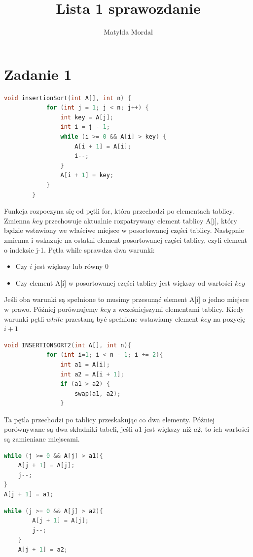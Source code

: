 \documentclass{article}
\author{Matylda Mordal}
\title{\textbf{Lista 1 sprawozdanie}}
\date{}
\begin{document}
	\maketitle
	\section*{Zadanie 1}
	\begin{lstlisting}[language=C++, tabsize=3]
		void insertionSort(int A[], int n) {
			for (int j = 1; j < n; j++) {
				int key = A[j]; 
				int i = j - 1;
				while (i >= 0 && A[i] > key) {
					A[i + 1] = A[i];
					i--;
				}
				A[i + 1] = key; 
			}
		}
    \end{lstlisting}
    Funkcja rozpoczyna się od pętli for, która przechodzi po elementach tablicy. Zmienna \(key\) przechowuje aktualnie rozpatrywany element tablicy A[j], który będzie wstawiony we właściwe miejsce w posortowanej części tablicy. Następnie zmienna i wskazuje na ostatni element posortowanej części tablicy, czyli element o indeksie j-1. Pętla while sprawdza dwa warunki: 
    \begin{itemize}
    	\item Czy \(i\) jest większy lub równy 0
    	\item Czy element A[i] w posortowanej części tablicy jest większy od wartości \(key\)
    \end{itemize}
    Jeśli oba warunki są spełnione to musimy przesunąć element A[i] o jedno miejsce w prawo. Później porównujemy \(key\) z wcześniejszymi elementami tablicy. Kiedy warunki pętli \(while\) przestaną być spełnione wstawiamy element \(key\) na pozycję \(i+1\)
    \begin{lstlisting}[language=C++, tabsize=3]
    	void INSERTIONSORT2(int A[], int n){
    		for (int i=1; i < n - 1; i += 2){
    			int a1 = A[i];
    			int a2 = A[i + 1]; 
    			if (a1 > a2) {
    				swap(a1, a2);       
    			}
	\end{lstlisting}
	Ta pętla przechodzi po tablicy przeskakując co dwa elementy. Później porównywane są dwa składniki tabeli, jeśli \(a1\) jest większy niż \(a2\), to ich wartości są zamieniane miejscami.
	\begin{multicols}{2}
	\begin{lstlisting}[language=C++, tabsize=3]
while (j >= 0 && A[j] > a1){
	A[j + 1] = A[j];
	j--;
}
A[j + 1] = a1;
	\end{lstlisting}
	\columnbreak
	\begin{lstlisting}[language=C++, tabsize=3]
	while (j >= 0 && A[j] > a2){
		A[j + 1] = A[j];
		j--;
	}
	A[j + 1] = a2;
	\end{lstlisting}
	\end{multicols}
\end{document}
